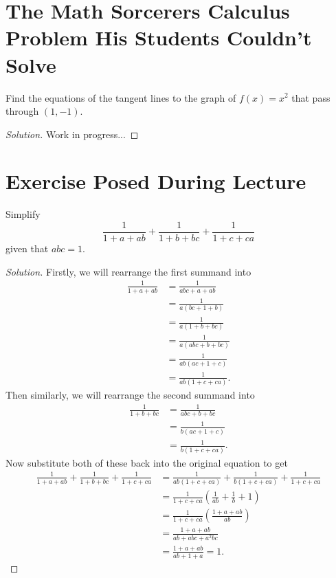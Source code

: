 \documentclass[11pt]{article}
\begin{document}
\newpage

\section{The Math Sorcerers Calculus Problem His Students Couldn't Solve}
Find the equations of the tangent lines to the graph of $f(x) = x^2$ that pass through $(1,-1)$.
\renewcommand\qedsymbol{$\diagup\!\!\!\diagup$}
\begin{proof}[Solution]
Work in progress...
\end{proof}

\newpage

\section{Exercise Posed During Lecture}
Simplify
\[\frac{1}{1+a+ab} + \frac{1}{1+b+bc} + \frac{1}{1+c+ca}\]
given that $abc=1$.
\begin{proof}[Solution]
Firstly, we will rearrange the first summand into
	\begin{equation*}
		\begin{aligned}
			\frac{1}{1+a+ab} &= \frac{1}{abc + a + ab} \\
			                 &= \frac{1}{a(bc + 1 + b)} \\
					 &= \frac{1}{a(1 + b + bc)} \\
					 &= \frac{1}{a(abc + b + bc)} \\
					 &= \frac{1}{ab(ac + 1 + c)} \\
					 &= \frac{1}{ab(1 + c + ca)}.
		\end{aligned}
	\end{equation*}
Then similarly, we will rearrange the second summand into
	\begin{equation*}
		\begin{aligned}
			\frac{1}{1+b+bc} &= \frac{1}{abc + b + bc} \\
			                 &= \frac{1}{b(ac + 1 + c)} \\
					 &= \frac{1}{b(1 + c + ca)}.
		\end{aligned}
	\end{equation*}
Now substitute both of these back into the original equation to get
	\begin{equation*}
		\begin{aligned}
			\frac{1}{1+a+ab} + \frac{1}{1+b+bc} + \frac{1}{1+c+ca} &= \frac{1}{ab(1 + c + ca)} + \frac{1}{b(1 + c + ca)} + \frac{1}{1+c+ca} \\
									       &= \frac{1}{1+c+ca}\left(\frac{1}{ab} + \frac{1}{b} + 1\right) \\
									       &= \frac{1}{1+c+ca}\left(\frac{1+a+ab}{ab}\right) \\
									       &= \frac{1+a+ab}{ab+abc+a^2bc} \\
									       &= \frac{1+a+ab}{ab+1+a} = 1.
		\end{aligned}
	\end{equation*}
\end{proof}
\renewcommand\qedsymbol{$square$}
\end{document}
